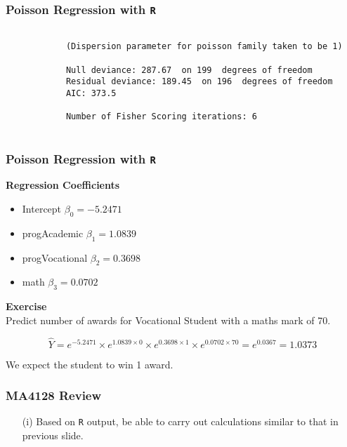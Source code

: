\documentclass[MASTER.tex]{subfiles}
\begin{document}
\begin{frame}[fragile]
		\frametitle{Poisson Regression with \texttt{R}}


			\begin{verbatim}
			
			(Dispersion parameter for poisson family taken to be 1)
			
			Null deviance: 287.67  on 199  degrees of freedom
			Residual deviance: 189.45  on 196  degrees of freedom
			AIC: 373.5
			
			Number of Fisher Scoring iterations: 6
			
			\end{verbatim}
	
\end{frame}
\begin{frame}
\frametitle{Poisson Regression with \texttt{R}}
\noindent \textbf{Regression Coefficients}
\begin{itemize}
	\item        Intercept    $\beta_0 = -5.2471$
	\item			progAcademic $\beta_1 =    1.0839   $
	\item			progVocational  $\beta_2 =  0.3698  $
	\item			math           $\beta_3 =   0.0702 $
\end{itemize}

\noindent \textbf{Exercise}\\
Predict number of awards for Vocational Student with a maths mark of 70.

\[\hat{Y} = e^{-5.2471} \times e^{1.0839 \times 0}\times e^{0.3698 \times 1}\times e^{0.0702 \times 70} =e^{0.0367} = 1.0373\]

We expect the student to win 1 award.

\end{frame}
\begin{frame}
	\frametitle{MA4128 Review}
	\large
	\begin{itemize}
		\item[(i)] Based on \texttt{R} output, be able to carry out calculations similar to that in previous slide.
	\end{itemize}
\end{frame}
\end{document}

